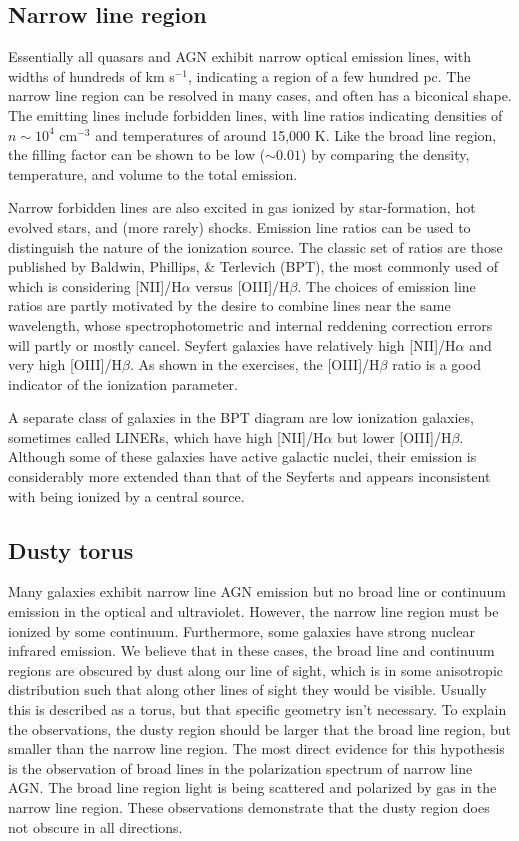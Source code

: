 \subsection{Narrow line region}

Essentially all quasars and AGN exhibit narrow optical emission lines,
with widths of hundreds of km s$^{-1}$, indicating a region of a few
hundred pc. The narrow line region can be resolved in many cases, and
often has a biconical shape. The emitting lines include forbidden
lines, with line ratios indicating densities of $n\sim 10^4$ cm$^{-3}$
and temperatures of around 15,000 K. Like the broad line region, the
filling factor can be shown to be low ($\sim 0.01$) by comparing the
density, temperature, and volume to the total emission.

Narrow forbidden lines are also excited in gas ionized by
star-formation, hot evolved stars, and (more rarely) shocks. Emission
line ratios can be used to distinguish the nature of the ionization
source. The classic set of ratios are those published by Baldwin,
Phillips, \& Terlevich (BPT), the most commonly used of which is
considering [NII]/H$\alpha$ versus [OIII]/H$\beta$. The choices of
emission line ratios are partly motivated by the desire to combine
lines near the same wavelength, whose spectrophotometric and internal
reddening correction errors will partly or mostly cancel. Seyfert
galaxies have relatively high [NII]/H$\alpha$ and very high
[OIII]/H$\beta$. As shown in the exercises, the [OIII]/H$\beta$ ratio
is a good indicator of the ionization parameter.

A separate class of galaxies in the BPT diagram are low ionization
galaxies, sometimes called LINERs, which have high [NII]/H$\alpha$ but
lower [OIII]/H$\beta$. Although some of these galaxies have active
galactic nuclei, their emission is considerably more extended than
that of the Seyferts and appears inconsistent with being ionized by a
central source. 

\subsection{Dusty torus}

Many galaxies exhibit narrow line AGN emission but no broad line or
continuum emission in the optical and ultraviolet. However, the narrow
line region must be ionized by some continuum. Furthermore, some
galaxies have strong nuclear infrared emission. We believe that in
these cases, the broad line and continuum regions are obscured by dust
along our line of sight, which is in some anisotropic distribution
such that along other lines of sight they would be visible. Usually
this is described as a torus, but that specific geometry isn't
necessary. To explain the observations, the dusty region should be
larger that the broad line region, but smaller than the narrow line
region. The most direct evidence for this hypothesis is the
observation of broad lines in the polarization spectrum of narrow line
AGN. The broad line region light is being scattered and polarized by
gas in the narrow line region. These observations demonstrate that the
dusty region does not obscure in all directions.

